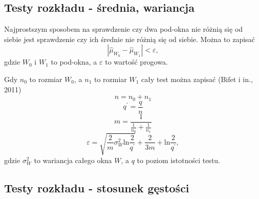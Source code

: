 \subsection{Testy rozkładu - średnia, wariancja}
\label{sub:TestsMeanAndVar}
Najprostszym sposobem na sprawdzenie czy dwa pod-okna nie różnią się od siebie
jest sprawdzenie czy ich średnie nie różnią się od siebie.
Można to zapisać
$$ | \hat{\mu}_{W_{0}} - \hat{\mu}_{W_{1}} | < \varepsilon, $$
gdzie $W_{0}$ i $W_{1}$ to pod-okna, a $\varepsilon$ to wartość progowa.

Gdy $n_{0}$ to rozmiar $W_{0}$,
a $n_{1}$ to rozmiar $W_{1}$ cały test można zapisać (Bifet i in., 2011)
$$n = n_{0} + n_{1}$$
$$q^\prime = \frac{q}{n}$$
$$m=\frac{1}{\frac{1}{n_0}+\frac{1}{n_1}}$$
$$\varepsilon = \sqrt{\frac{2}{m} \sigma^{2}_{W} \mbox{ln}\frac{2}{q^\prime}} + \frac{2}{3m} + \mbox{ln}\frac{2}{q^\prime},$$
gdzie $\sigma^{2}_{W}$ to wariancja całego okna $W$,
a $q$ to poziom istotności testu.
\subsection{Testy rozkładu - stosunek gęstości}
\label{sub:TestDensityRatio}
